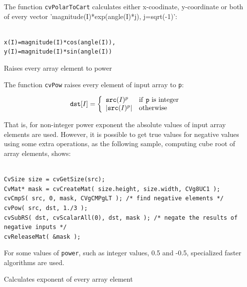 The function \texttt{cvPolarToCart} calculates either x-coodinate, y-coordinate or both of every vector 'magnitude(I)*exp(angle(I)*j), j=sqrt(-1)':

\begin{lstlisting}

x(I)=magnitude(I)*cos(angle(I)),
y(I)=magnitude(I)*sin(angle(I))

\end{lstlisting}


\label{Pow}

Raises every array element to power


\begin{description}
\end{description}


The function \texttt{cvPow} raises every element of input array to \texttt{p}:

\[
\texttt{dst} [I] = \left\{ \begin{array}{l l} \texttt{src}(I)^p & \mbox{if \texttt{p} is integer}\\ |\texttt{src}(I)^p| & \mbox{otherwise}\\ \end{array} \right.
\]

That is, for non-integer power exponent the absolute values of input array elements are used. However, it is possible to get true values for negative values using some extra operations, as the following sample, computing cube root of array elements, shows:

\begin{lstlisting}

CvSize size = cvGetSize(src);
CvMat* mask = cvCreateMat( size.height, size.width, CVg8UC1 );
cvCmpS( src, 0, mask, CVgCMPgLT ); /* find negative elements */
cvPow( src, dst, 1./3 );
cvSubRS( dst, cvScalarAll(0), dst, mask ); /* negate the results of negative inputs */
cvReleaseMat( &mask );

\end{lstlisting}

For some values of \texttt{power}, such as integer values, 0.5 and -0.5, specialized faster algorithms are used.

\label{Exp}

Calculates exponent of every array element

